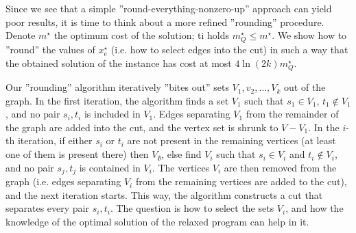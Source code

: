 \noindent
Since we see that a simple ''round-everything-nonzero-up'' approach can yield poor results, it is time to think
about a more refined ''rounding'' procedure. Denote  $m^\star$ the optimum cost of the \minmulticut solution;
ti holds  $m_Q^\star\le m^\star$. We show how to ''round'' the values of $x_e^\star$ (i.e. how to select edges
into the cut) in such a way that the obtained solution of the \minmulticut instance has cost at most 
$4\ln(2k)m_Q^\star$.

\noindent
Our ''rounding'' algorithm iteratively ''bites out'' sets $V_1,v_2,\ldots,V_k$ out of the graph. 
In the first iteration, the algorithm finds a set $V_1$ such that  $s_1\in V_1$, $t_1\not\in V_1$, and 
no pair  $s_i, t_i$ is included in $V_1$. Edges separating $V_1$ from the remainder of the graph are
added into the cut, and the vertex set is shrunk to $V-V_1$. In the $i$-th iteration, if either $s_i$ or $t_i$
are not present in the remaining vertices (at least one of them is present there) then $V_\emptyset$, else
find $V_i$ such that $s_i\in V_i$ and $t_i\not\in V_i$, and no pair $s_j,t_j$ is contained in $V_i$. 
The vertices $V_i$ are then removed from the graph (i.e. edges separating $V_i$ from the remaining vertices are
added to the cut), and the next iteration starts. This way, the algorithm constructs a cut that separates every pair 
$s_i, t_i$. The question is how to select the sets $V_i$, and how the knowledge of the optimal solution of the relaxed
program can help in it. 


